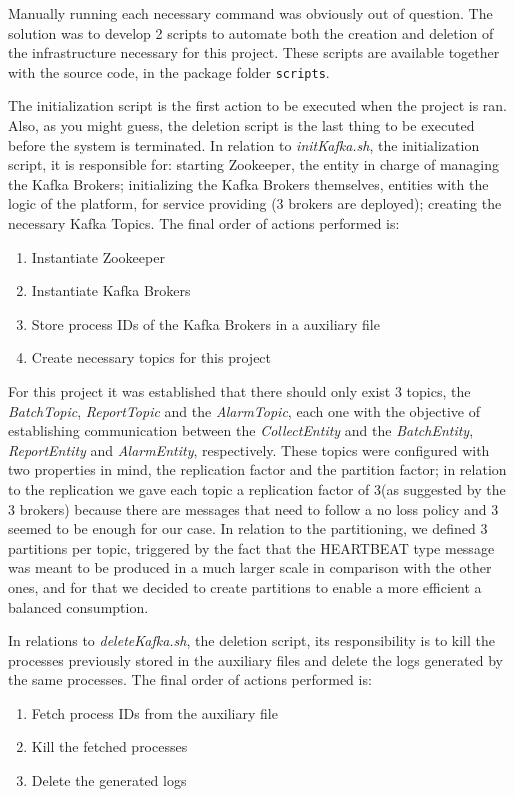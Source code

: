 \documentclass[12pt]{article}
\begin{document}
Manually running each necessary command was obviously out of question.
The solution was to develop 2 scripts to automate both the creation and deletion of the infrastructure necessary for this project. 
These scripts are available together with the source code, in the package folder \texttt{scripts}.

The initialization script is the first action to be executed when the project is ran.
Also, as you might guess, the deletion script is the last thing to be executed before the system is terminated.
In relation to \textit{initKafka.sh}, the initialization script, it is responsible for: starting Zookeeper, the entity in charge of managing the Kafka Brokers;
initializing the Kafka Brokers themselves, entities with the logic of the platform, for service providing (3 brokers are deployed); creating the necessary Kafka Topics.
The final order of actions performed is:
\vspace{-10pt}
\begin{enumerate} [noitemsep]
  \item Instantiate Zookeeper
  \item Instantiate Kafka Brokers
  \item Store process IDs of the Kafka Brokers in a auxiliary file
  \item Create necessary topics for this project
\end{enumerate}
\vspace{-10pt}
For this project it was established that there should only exist 3 topics, the \textit{BatchTopic}, \textit{ReportTopic} and the \textit{AlarmTopic}, each one with the objective of establishing communication between the \textit{CollectEntity} and the \textit{BatchEntity}, \textit{ReportEntity} and \textit{AlarmEntity}, respectively. These topics were configured with two properties in mind, the replication factor and the partition factor; in relation to the replication we gave each topic a replication factor of 3(as suggested by the 3 brokers) because there are messages that need to follow a no loss policy and 3 seemed to be enough for our case. In relation to the partitioning, we defined 3 partitions per topic, triggered by the fact that the HEARTBEAT type message was meant to be produced in a much larger scale in comparison with the other ones, and for that we decided to create partitions to enable a more efficient a balanced consumption.

In relations to \textit{deleteKafka.sh}, the deletion script, its responsibility is to kill the processes previously stored in the auxiliary files and delete 
the logs generated by the same processes.
The final order of actions performed is:
\vspace{-10pt}
\begin{enumerate} [noitemsep]
  \item Fetch process IDs from the auxiliary file
  \item Kill the fetched processes
  \item Delete the generated logs
\end{enumerate}
\vspace{-10pt}
\end{document}

